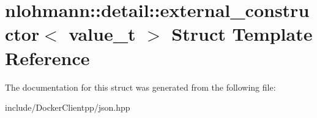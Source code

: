 \hypertarget{structnlohmann_1_1detail_1_1external__constructor}{}\section{nlohmann\+::detail\+::external\+\_\+constructor$<$ value\+\_\+t $>$ Struct Template Reference}
\label{structnlohmann_1_1detail_1_1external__constructor}


The documentation for this struct was generated from the following file\+:\begin{DoxyCompactItemize}
\item 
include/\+Docker\+Clientpp/json.\+hpp\end{DoxyCompactItemize}
